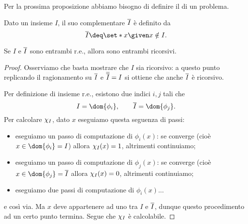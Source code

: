 Per la prossima proposizione abbiamo bisogno di definire il  di un problema.

\begin{definition}
    Dato un insieme $I$, il suo complementare $\overline{I}$ è definito da \[
        \compl{I} \deq \set*{x \given x \notin I}.
    \] 
\end{definition}

\begin{proposition}[ ][I_complI_re=>both_rec]
    Se $I$ e $\overline{I}$ sono entrambi r.e., allora sono entrambi ricorsivi.
\end{proposition}
\begin{proof}
    Osserviamo che basta mostrare che $I$ sia ricorsivo: a questo punto replicando il ragionamento su $\overline{I}$ e $\overline{\overline{I}} = I$ si ottiene che anche $\overline{I}$ è ricorsivo.
    
    Per definizione di insieme r.e., esistono due indici $i, j$ tali che \[
        I = \dom{\phi_i}, \qquad \compl{I} = \dom{\phi_j}. 
    \] Per calcolare $\chi_{I}$, dato $x$ eseguiamo questa seguenza di passi:
    \begin{itemize}
        \item eseguiamo un passo di computazione di $\phi_i(x)$: se converge (cioè $x \in \dom{\phi_i} = I$) allora $\chi_{I}(x) = 1$, altrimenti continuiamo;
        \item eseguiamo un passo di computazione di $\phi_j(x)$: se converge (cioè $x \in \dom{\phi_j} = \compl{I}$ allora $\chi_{I}(x) = 0$, altrimenti continuiamo;    
        \item eseguiamo due passi di computazione di $\phi_i(x)$... 
    \end{itemize}
    e così via. Ma $x$ deve appartenere ad uno tra $I$ e $\overline{I}$, dunque questo procedimento ad un certo punto termina. Segue che $\chi_{I}$ è calcolabile.  
\end{proof}
